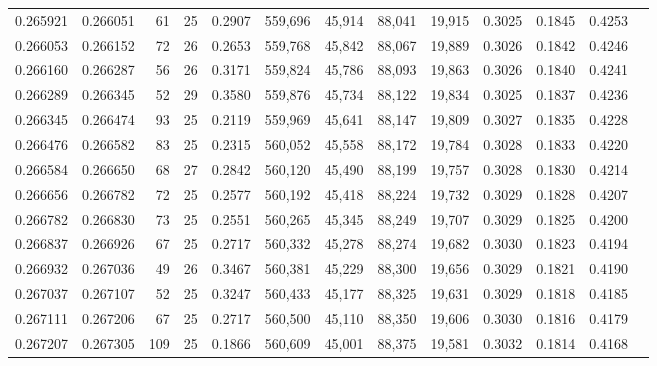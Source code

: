\begin{tabular}{rrrrrrrrrrrrr}
0.265921 & 0.266051 &  61 &  25 &                                     0.2907 & 559,696 &  45,914 &  88,041 &  19,915 & 0.3025 & 0.1845 & 0.4253 \\
0.266053 & 0.266152 &  72 &  26 &                                     0.2653 & 559,768 &  45,842 &  88,067 &  19,889 & 0.3026 & 0.1842 & 0.4246 \\
0.266160 & 0.266287 &  56 &  26 &                                     0.3171 & 559,824 &  45,786 &  88,093 &  19,863 & 0.3026 & 0.1840 & 0.4241 \\
0.266289 & 0.266345 &  52 &  29 &                                     0.3580 & 559,876 &  45,734 &  88,122 &  19,834 & 0.3025 & 0.1837 & 0.4236 \\
0.266345 & 0.266474 &  93 &  25 &                                     0.2119 & 559,969 &  45,641 &  88,147 &  19,809 & 0.3027 & 0.1835 & 0.4228 \\
0.266476 & 0.266582 &  83 &  25 &                                     0.2315 & 560,052 &  45,558 &  88,172 &  19,784 & 0.3028 & 0.1833 & 0.4220 \\
0.266584 & 0.266650 &  68 &  27 &                                     0.2842 & 560,120 &  45,490 &  88,199 &  19,757 & 0.3028 & 0.1830 & 0.4214 \\
0.266656 & 0.266782 &  72 &  25 &                                     0.2577 & 560,192 &  45,418 &  88,224 &  19,732 & 0.3029 & 0.1828 & 0.4207 \\
0.266782 & 0.266830 &  73 &  25 &                                     0.2551 & 560,265 &  45,345 &  88,249 &  19,707 & 0.3029 & 0.1825 & 0.4200 \\
0.266837 & 0.266926 &  67 &  25 &                                     0.2717 & 560,332 &  45,278 &  88,274 &  19,682 & 0.3030 & 0.1823 & 0.4194 \\
0.266932 & 0.267036 &  49 &  26 &                                     0.3467 & 560,381 &  45,229 &  88,300 &  19,656 & 0.3029 & 0.1821 & 0.4190 \\
0.267037 & 0.267107 &  52 &  25 &                                     0.3247 & 560,433 &  45,177 &  88,325 &  19,631 & 0.3029 & 0.1818 & 0.4185 \\
0.267111 & 0.267206 &  67 &  25 &                                     0.2717 & 560,500 &  45,110 &  88,350 &  19,606 & 0.3030 & 0.1816 & 0.4179 \\
0.267207 & 0.267305 & 109 &  25 &                                     0.1866 & 560,609 &  45,001 &  88,375 &  19,581 & 0.3032 & 0.1814 & 0.4168 \\

\end{tabular}
